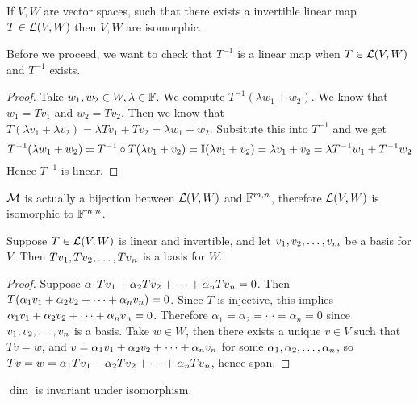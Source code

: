 \begin{definition}
    If $V,W$ are vector spaces, such that there exists a invertible linear map $T \in \mathcal L(V,W)$ then $V, W$ are isomorphic.
\end{definition}
\begin{remark}
    Before we proceed, we want to check that $T^{-1}$ is a linear map when $T \in \mathcal L(V,W)$ and $T^{-1}$ exists.
\end{remark}
\begin{proof}
    Take $w_1,w_2 \in W, \lambda \in \mathbb F$. We compute
    $T^{-1} (\lambda w_1 + w_2)$. We know that $w_1 = Tv_1$ and $w_2 = Tv_2$. Then we know that $T(\lambda v_1  + \lambda v_2) = \lambda Tv_1 + Tv_2 = \lambda w_1 + w_2$. Subsitute this into $T^{-1}$ and we get
    \[ T^{-1} (\lambda w_1 + w_2) = T^{-1} \circ T (\lambda v_1 + v_2) = \mathbb I (\lambda v_1 + v_2) = \lambda v_1 + v_2 = \lambda T^{-1} w_1 + T^{-1} w_2\] Hence $T^{-1}$ is linear.
\end{proof}
\begin{corollary}
    $\mathcal M$ is actually a bijection between $\mathcal L(V,W)$ and $\mathbb F^{m,n}$, therefore $\mathcal L(V,W)$ is isomorphic to $\mathbb F^{m,n}$.
\end{corollary}
\begin{theorem}
    Suppose $T \in \mathcal L(V,W)$ is linear and invertible, and let ${v}_1,{v}_2, \ldots, {v}_{m}$ be a basis for $V$. Then ${Tv}_1,{Tv}_2, \ldots, {Tv}_{n}$ is a basis for $W$.
\end{theorem}
\begin{proof}
    Suppose ${\alpha}_1{Tv}_1 + {\alpha}_2{Tv}_2 + \cdots + {\alpha}_{n}{Tv}_{n} = 0$. Then $T({\alpha}_1{v}_1 + {\alpha}_2{v}_2 + \cdots + {\alpha}_{n}{v}_{n}) = 0$. Since $T$ is injective, this implies ${\alpha}_1{v}_1 + {\alpha}_2{v}_2 + \cdots + {\alpha}_{n}{v}_{n} = 0$. Therefore $\alpha_1 = \alpha_2 = \cdots = \alpha_n = 0$ since ${v}_1,{v}_2, \ldots, {v}_{n}$ is a basis. Take $w \in W$, then there exists a unique $v \in V$ such that $Tv = w$, and $v  ={\alpha}_1{v}_1 + {\alpha}_2{v}_2 + \cdots + {\alpha}_{n}{v}_{n}$ for some ${\alpha}_1,{\alpha}_2, \ldots, {\alpha}_{n}$, so $Tv = w = {\alpha}_1{Tv}_1 + {\alpha}_2{Tv}_2 + \cdots + {\alpha}_{n}{Tv}_{n}$, hence span. 
\end{proof}
\begin{corollary}
    $\dim$ is invariant under isomorphism.
\end{corollary}
